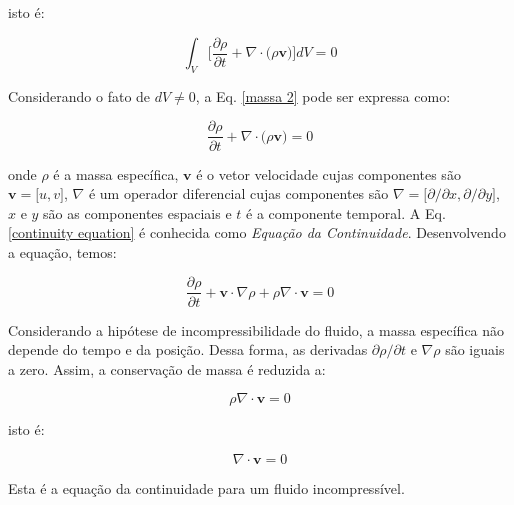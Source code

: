\medskip
\noindent
isto é:

\begin{equation} \label{massa 2}
 \int_{V} \Bigg[ \frac{\partial \rho}{\partial t}
 + 
 \nabla \cdot \big( \rho \textbf{v} \big) \Bigg] dV
 = 0 
\end{equation}

\medskip
\noindent 
Considerando o fato de $dV \neq 0$,
a Eq. \ref{massa 2} pode ser expressa como:

\begin{equation} \label{continuity equation}
 \frac{\partial \rho}{\partial t}
 + 
 \nabla \cdot \big( \rho \textbf{v} \big)
 = 0 
\end{equation}

\medskip
\noindent 
onde $\rho$ é a massa específica, $\textbf{v}$ é o vetor
velocidade cujas componentes são $\textbf{v} = \big[u,v\big]$,
$\nabla$ é um operador diferencial cujas componentes são
$\nabla = \big[ \partial/\partial x, \partial / \partial y \big]$,
$x$ e $y$ são as componentes espaciais e
$t$ é a componente temporal.
A Eq. \ref{continuity equation} é conhecida
como \textit{Equação da Continuidade}.
Desenvolvendo a equação, temos:

\begin{equation}
 \frac{\partial \rho}{\partial t}
 +
 \textbf{v} \cdot \nabla \rho
 +
 \rho \nabla \cdot \textbf{v}
 = 0
\end{equation}

\medskip
Considerando a hipótese de incompressibilidade do fluido,
a massa específica não depende do tempo e da posição. Dessa forma, as derivadas
$\partial \rho / \partial t$ e $\nabla \rho$ são iguais a zero.
Assim, a conservação de massa é reduzida a:

\begin{equation} \label{massa 3}
 \rho \nabla \cdot \textbf{v}
 = 0 
\end{equation}

\medskip
\noindent isto é:

\begin{equation} \label{incompressible continuity equation}
 \nabla \cdot \textbf{v}
 = 0 
\end{equation}

\medskip
\noindent Esta é a equação da continuidade para um fluido incompressível.


\newpage



